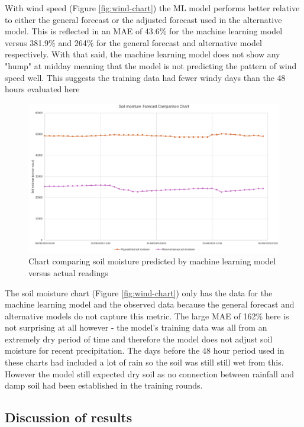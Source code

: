 With wind speed (Figure \ref{fig:wind-chart}) the ML model performs better
relative to either the general forecast or the adjusted forecast used in the
alternative model. This is reflected in an MAE of 43.6\% for the machine
learning model versus 381.9\% and 264\% for the general forecast and alternative
model respectively. With that said, the machine learning model does not show any
"hump" at midday meaning that the model is not predicting the pattern of wind
speed well. This suggests the training data had fewer windy days than the 48
hours evaluated here

\begin{figure}[H]
    \centering
    \includegraphics[width=1\textwidth]{contents/part-4/fig4/soil-graph.png}
    \caption{Chart comparing soil moisture predicted by machine learning model versus actual readings}
    \label{fig:soil-chart}
\end{figure}

The soil moisture chart (Figure \ref{fig:wind-chart}) only has the data for the
machine learning model and the observed data because the general forecast and
alternative models do not capture this metric. The large MAE of 162\% here is
not surprising at all however - the model's training data was all from an
extremely dry period of time and therefore the model does not adjust soil
moisture for recent precipitation. The days before the 48 hour period used in
these charts had included a lot of rain so the soil was still still wet from
this. However the model still expected dry soil as no connection between
rainfall and damp soil had been established in the training rounds.

\subsection{Discussion of results}

